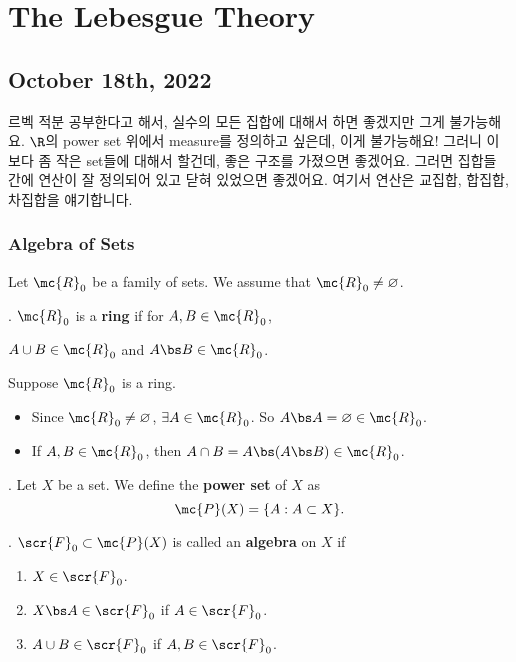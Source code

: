\setcounter{chapter}{10}

\chapter{The Lebesgue Theory}

\section*{October 18th, 2022}



르벡 적분 공부한다고 해서, 실수의 모든 집합에 대해서 하면 좋겠지만 그게 불가능해요. \(\R\)의 power set 위에서 measure를 정의하고 싶은데, 이게 불가능해요! 그러니 이보다 좀 작은 set들에 대해서 할건데, 좋은 구조를 가졌으면 좋겠어요. 그러면 집합들 간에 연산이 잘 정의되어 있고 닫혀 있었으면 좋겠어요. 여기서 연산은 교집합, 합집합, 차집합을 얘기합니다.

\subsection*{Algebra of Sets}

Let \(\mc{R}_0\) be a family of sets. We assume that \(\mc{R}_0 \neq \varnothing\).

.  \(\mc{R}_0\) is a \textbf{ring} if for \(A, B \in \mc{R}_0\),
\begin{center}
    \(A \cup B \in \mc{R}_0\) and \(A \bs B \in \mc{R}_0\).
\end{center}

\rmk Suppose \(\mc{R}_0\) is a ring.
\begin{itemize}
    \item Since \(\mc{R}_0\neq \varnothing\), \(\exists A \in \mc{R}_0\). So \(A \bs A = \varnothing \in \mc{R}_0\).
    \item If \(A, B \in \mc{R}_0\), then \(A \cap B = A \bs (A \bs B) \in \mc{R}_0\).
\end{itemize}

\medskip

.  Let \(X\) be a set. We define the \textbf{power set} of \(X\) as
\[
    \mc{P}(X) = \{A : A \subset X\}.
\]

\pagebreak

.  \(\scr{F}_0 \subset \mc{P}(X)\) is called an \textbf{algebra} on \(X\) if
\begin{enumerate}
    \item \(X \in \scr{F}_0\).
    \item \(X \bs A \in \scr{F}_0\) if \(A \in \scr{F}_0\).
    \item \(A\cup B \in \scr{F}_0\) if \(A, B \in \scr{F}_0\).
\end{enumerate}

